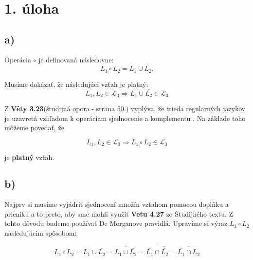 \documentclass[11pt,a4paper]{article}
\begin{document}
\setlength{\parskip}{0pt}
    \hypersetup{hidelinks}\tableofcontents
\setlength{\parskip}{0pt}

\newpage




\section{1. úloha}
\subsection{a)}

Operácia $\circ$ je definovaná následovne:
\begin{equation}
L_1 \circ L_2 = L_1 \cup \overline{L_2}.
\end{equation}


Musíme dokázať, že následujúci vzťah je platný:
\begin{equation}
L_1, L_2 \in \mathcal{L}_3 \Rightarrow L_1 \cup \overline{L_2} \in \mathcal{L}_3
\end{equation}

Z \textbf{Věty 3.23}(študijná opora - strana 50.) vyplýva, že trieda regularných jazykov je uzavretá vzhľadom k operáciam sjednocenie a komplementu \cite{AA}. Na základe toho môžeme povedať, že

\begin{equation}
L_1, L_2 \in \mathcal{L}_3 \Rightarrow L_1 \circ L_2 \in \mathcal{L}_3
\end{equation}

je \textbf{platný} vzťah.










\subsection{b)}

Najprv si musíme vyjádriť sjednocení množín vzťahom pomocou doplňku a prieniku a to preto, aby sme mohli využiť \textbf{Vetu 4.27} zo Študijného textu. Z tohto dôvodu budeme používať De Morganove pravidlá. Upravíme si
výraz $L_1 \circ L_2$ nasledujúcim spôsobom:

\begin{equation}
L_1 \circ L_2 = L_1 \cup \overline{L_2} = \overline{\overline{L_1 \cup \overline{L_2}}} = \overline{\overline{L_1} \cap \overline{\overline{L_2}}} = \overline{\overline{L_1} \cap L_2}
\end{equation}
\end{document}
